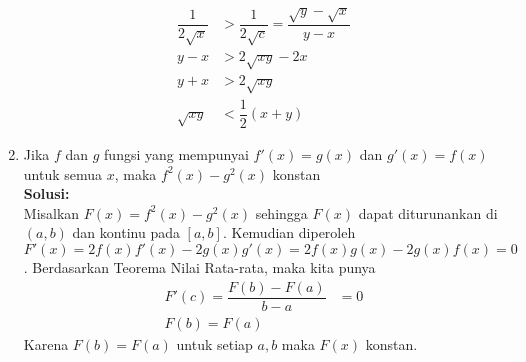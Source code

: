 \documentclass{article}
\begin{document}
\begin{enumerate}
	 \begin{align*}
	 \dfrac{1}{2\sqrt{x}} &> \dfrac{1}{2\sqrt{c}} = \dfrac{\sqrt{y}-\sqrt{x}}{y-x}\\
	 y-x &> 2\sqrt{xy}-2x \\
	 y+x &> 2\sqrt{xy} \\
	 \sqrt{xy} &< \dfrac{1}{2}(x+y)
	 \end{align*}
	 \item Jika $f$ dan $g$ fungsi yang mempunyai $f'(x)=g(x)$ dan $g'(x)=f(x)$ untuk semua $x$, maka $f^2(x)-g^2(x)$ konstan
	 \\[0.1 cm] \textbf{Solusi:}\\
	 Misalkan $F(x)=f^2(x)-g^2(x)$ sehingga $F(x)$ dapat diturunankan di $(a,b)$ dan kontinu pada $[a,b]$. Kemudian diperoleh $F'(x)=2f(x)f'(x)-2g(x)g'(x)=2f(x)g(x)-2g(x)f(x)=0$. Berdasarkan Teorema Nilai Rata-rata, maka kita punya
	 \begin{align*}
	 F'(c) = \dfrac{F(b)-F(a)}{b-a} &= 0 \\
	 F(b)=F(a)
	 \end{align*}
	 Karena $F(b)=F(a)$ untuk setiap $a,b$ maka $F(x)$ konstan.
\end{enumerate}
\end{document}
